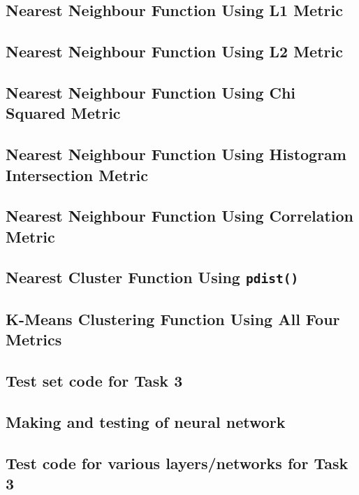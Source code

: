 \documentclass[a4paper, 10pt, conference]{ieeeconf}
\begin{document}
\subsection{Nearest Neighbour Function Using L1 Metric}


\subsection{Nearest Neighbour Function Using L2 Metric}

\newpage

\subsection{Nearest Neighbour Function Using Chi Squared Metric}


\subsection{Nearest Neighbour Function Using Histogram Intersection Metric}

\newpage

\subsection{Nearest Neighbour Function Using Correlation Metric}


\subsection{Nearest Cluster Function Using \texttt{pdist()}}

\newpage

\subsection{K-Means Clustering Function Using All Four Metrics}

\newpage

\subsection*{Test set code for Task 3}

\newpage

\subsection*{Making and testing of neural network}

\newpage

\subsection*{Test code for various layers/networks for Task 3}

\newpage
\end{document}
